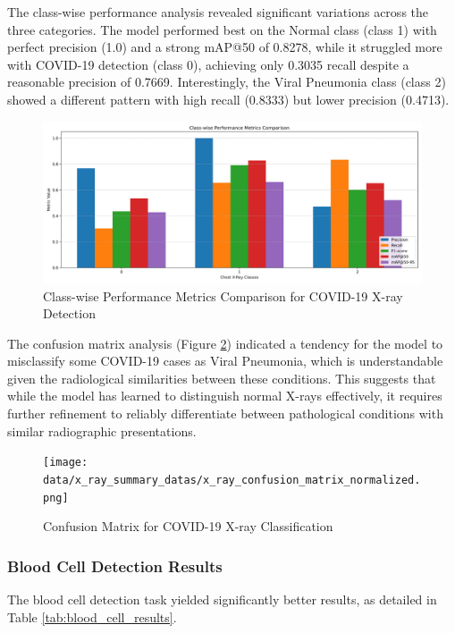 \begin{multicols}{2}
The class-wise performance analysis revealed significant variations across the three categories. The model performed best on the Normal class (class 1) with perfect precision (1.0) and a strong mAP@50 of 0.8278, while it struggled more with COVID-19 detection (class 0), achieving only 0.3035 recall despite a reasonable precision of 0.7669. Interestingly, the Viral Pneumonia class (class 2) showed a different pattern with high recall (0.8333) but lower precision (0.4713).

\begin{figure}[h]
\centering
\includegraphics[width=0.9\columnwidth]{datas/x_ray_summary_datas/x_ray_class_comparison.png}
\caption{Class-wise Performance Metrics Comparison for COVID-19 X-ray Detection}
\label{fig:covid_class_metrics}
\end{figure}

The confusion matrix analysis (Figure \ref{fig:covid_confusion}) indicated a tendency for the model to misclassify some COVID-19 cases as Viral Pneumonia, which is understandable given the radiological similarities between these conditions. This suggests that while the model has learned to distinguish normal X-rays effectively, it requires further refinement to reliably differentiate between pathological conditions with similar radiographic presentations.

\begin{figure}[h]
\centering
\texttt{[image: data/x\_ray\_summary\_datas/x\_ray\_confusion\_matrix\_normalized.png]}
\caption{Confusion Matrix for COVID-19 X-ray Classification}
\label{fig:covid_confusion}
\end{figure}

\subsubsection{Blood Cell Detection Results}

The blood cell detection task yielded significantly better results, as detailed in Table \ref{tab:blood_cell_results}.


\end{multicols}
